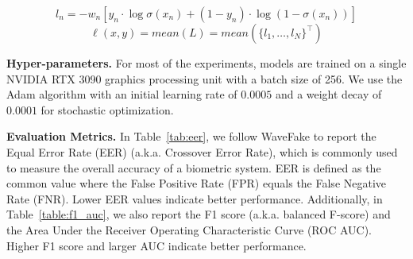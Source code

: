 \documentclass{article}
\begin{document}
\begin{equation}
    l_n = - w_n \left[ y_n \cdot \log \sigma(x_n) + (1 - y_n) \cdot \log (1 - \sigma(x_n)) \right]
\end{equation}
\begin{equation}
    \ell(x, y) = mean(L) = mean(\{l_1,\dots,l_N\}^\top)
\end{equation}

\textbf{Hyper-parameters.} For most of the experiments, models are trained on a single NVIDIA RTX 3090 graphics processing unit with a batch size of 256. We use the Adam \cite{Adam} algorithm with an initial learning rate of $0.0005$ and a weight decay of $0.0001$ for stochastic optimization.

\textbf{Evaluation Metrics.} In Table~\ref{tab:eer}, we follow WaveFake \cite{frank2021wavefake} to report the Equal Error Rate (EER) (a.k.a. Crossover Error Rate), which is commonly used to measure the overall accuracy of a biometric system. EER is defined as the common value where the False Positive Rate (FPR) equals the False Negative Rate (FNR). Lower EER values indicate better performance. Additionally, in Table~\ref{table:f1_auc}, we also report the F1 score (a.k.a. balanced F-score) and the Area Under the Receiver Operating Characteristic Curve (ROC AUC). Higher F1 score and larger AUC indicate better performance.
\end{document}
